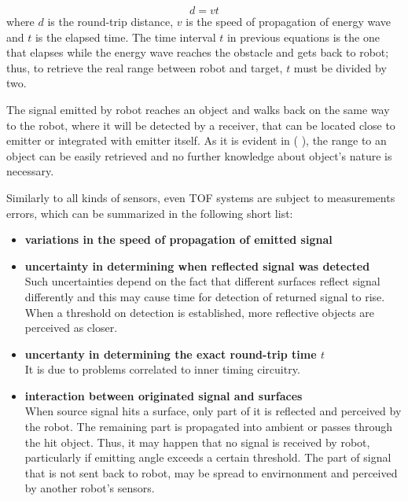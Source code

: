 \documentclass[a4paper, onecolumn]{report}
\begin{document}
\begin{equation}
	d = vt
\end{equation}
where $d$ is the round-trip distance, $v$ is the speed of propagation of energy wave and $t$ is the elapsed time. The time interval $t$ in previous equations is the one that elapses while the energy wave reaches the obstacle and gets back to robot; thus, to retrieve the real range between robot and target, $t$ must be divided by two.

The signal emitted by robot reaches an object and walks back on the same way to the robot, where it will be detected by a receiver, that can be located close to emitter or integrated with emitter itself.
As it is evident in ( ), the range to an object can be easily retrieved and no further knowledge about object's nature is necessary.

Similarly to all kinds of sensors, even TOF systems are subject to measurements errors, which can be summarized in the following short list:
\begin{itemize}
\item{\bf{variations in the speed of propagation of emitted signal}}
\item{\textbf{uncertainty in determining when reflected signal was detected}\\ 
Such uncertainties depend on the fact that different surfaces reflect signal differently and this may cause time for detection of returned signal to rise. When a threshold on detection is established, more reflective objects are perceived as closer.}
\item{\textbf{uncertanty in determining the exact round-trip time $t$}\\
 It is due to problems correlated to inner timing circuitry.}
\item{\textbf{interaction between originated signal and surfaces} \\
When source signal hits a surface, only part of it is reflected and perceived by the robot. The remaining part is propagated into ambient or passes through the hit object. Thus, it may happen that no signal is received by robot, particularly if emitting angle exceeds a certain threshold. The part of signal that is not sent back to robot, may be spread to envirnonment and perceived by another robot's sensors.}
\end{itemize}
\end{document}
